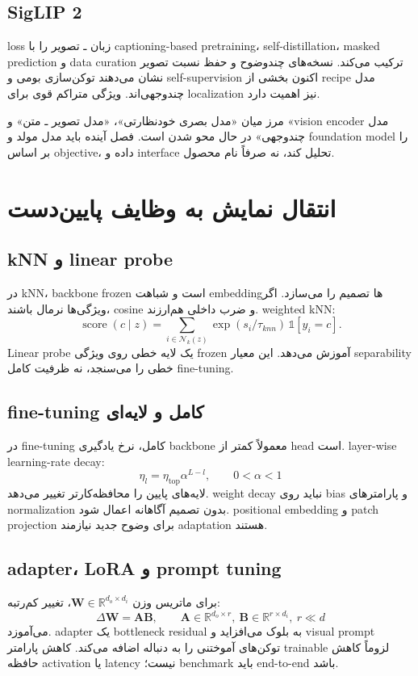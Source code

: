 \documentclass[12pt,openany,oneside]{book}
\newcommand{\R}{\mathbb{R}}
\newcommand{\mat}[1]{\bm{#1}}
\begin{document}
\subsection{SigLIP 2}
 loss زبان ـ تصویر را با captioning-based pretraining، self-distillation، masked prediction و data curation ترکیب می‌کند. نسخه‌های چندوضوح و حفظ نسبت تصویر نشان می‌دهند توکن‌سازی بومی و self-supervision اکنون بخشی از recipe مدل چندوجهی‌اند. ویژگی متراکم قوی برای localization نیز اهمیت دارد.

\begin{futurebox}
مرز میان «مدل بصری خودنظارتی»، «مدل تصویر ـ متن» و «vision encoder مدل چندوجهی» در حال محو شدن است. فصل آینده باید مدل مولد و foundation model را بر اساس objective، داده و interface تحلیل کند، نه صرفاً نام محصول.
\end{futurebox}

\section{انتقال نمایش به وظایف پایین‌دست}
\subsection{kNN و linear probe}
در kNN، backbone frozen است و شباهت embeddingها تصمیم را می‌سازد. اگر ویژگی‌ها نرمال باشند، cosine و ضرب داخلی هم‌ارزند. weighted kNN:
\begin{equation}
\operatorname{score}(c\mid z)=\sum_{i\in\mathcal N_k(z)}
\exp(s_i/\tau_{knn})\,\mathbb 1[y_i=c].
\end{equation}
Linear probe یک لایه خطی روی ویژگی frozen آموزش می‌دهد. این معیار separability خطی را می‌سنجد، نه ظرفیت کامل fine-tuning.

\subsection{fine-tuning کامل و لایه‌ای}
در fine-tuning کامل، نرخ یادگیری backbone معمولاً کمتر از head است. layer-wise learning-rate decay:
\begin{equation}
\eta_l=\eta_{\mathrm{top}}\alpha^{L-l},\qquad 0<\alpha<1
\end{equation}
لایه‌های پایین را محافظه‌کارتر تغییر می‌دهد. weight decay نباید روی bias و پارامترهای normalization بدون تصمیم آگاهانه اعمال شود. positional embedding و patch projection برای وضوح جدید نیازمند adaptation هستند.

\subsection{adapter، LoRA و prompt tuning}
برای ماتریس وزن $\mat W\in\R^{d_o\times d_i}$،  تغییر کم‌رتبه:
\begin{equation}
\Delta\mat W=\mat A\mat B,
\qquad
\mat A\in\R^{d_o\times r},\ \mat B\in\R^{r\times d_i},\ r\ll d
\end{equation}
می‌آموزد. adapter یک bottleneck residual به بلوک می‌افزاید و visual prompt توکن‌های آموختنی را به دنباله اضافه می‌کند. کاهش پارامتر trainable لزوماً کاهش حافظه activation یا latency نیست؛ benchmark باید end-to-end باشد.
\end{document}

